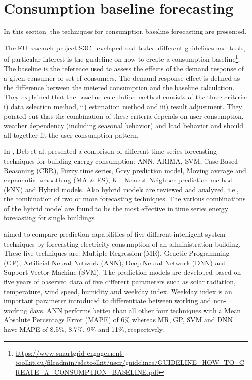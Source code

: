 \section{Consumption baseline forecasting}
\label{sec:baselinesoa}
\vspace{0.2 cm}

In this section, the techniques for consumption baseline forecasting are presented.

The EU research project S3C developed and tested different guidelines and tools, of particular interest is the guideline on how to create a consumption baseline\footnote{ \url{https://www.smartgrid-engagement-toolkit.eu/fileadmin/s3ctoolkit/user/guidelines/GUIDELINE_HOW_TO_CREATE_A_CONSUMPTION_BASELINE.pdf} }.
The baseline is the reference used to assess the effects of the demand response of a given consumer or set of consumers.
The demand response effect is defined as the difference between the metered consumption and the baseline calculation.
They explained that the baseline calculation method consists of the three criteria:
i) data selection method,
ii) estimation method
and iii) result adjustment.
They pointed out that the combination of these criteria depends on user consumption, weather dependency (including seasonal behavior) and load behavior and should all together fit the user consumption pattern.

In \cite{DEB2017902}, Deb et al. presented a comprison of different time series forecasting techniques for building energy consumption: ANN, ARIMA, SVM, Case-Based Reasoning (CBR), Fuzzy time series, Grey prediction model, Moving average and exponential smoothing (MA \& ES), K - Nearest Neighbor prediction method (kNN) and Hybrid models.
Also hybrid models are reviewed and analyzed, i.e., the combination of two or more forecasting techniques.
The various combinations of the hybrid model are found to be the most effective in time series energy forecasting for single buildings.

\cite{AMBER2018886} aimed to compare prediction capabilities of five different intelligent system techniques by forecasting electricity consumption of an administration building.
These five techniques are; Multiple Regression (MR), Genetic Programming (GP), Artificial Neural Network (ANN), Deep Neural Network (DNN) and Support Vector Machine (SVM).
The prediction models are developed based on five years of observed data of five different parameters such as solar radiation, temperature, wind speed, humidity and weekday index.
Weekday index is an important parameter introduced to differentiate between working and non-working days.
ANN performs better than all other four techniques with a Mean Absolute Percentage Error (MAPE) of 6\% whereas MR, GP, SVM and DNN have MAPE of 8.5\%, 8.7\%, 9\% and 11\%, respectively.

